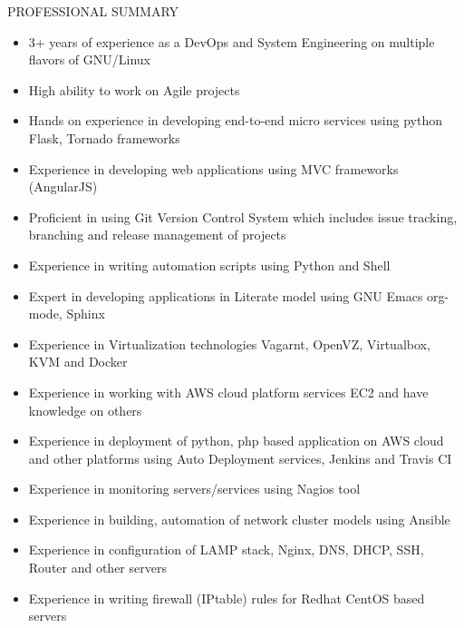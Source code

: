 \documentclass{resume} %
\begin{document}
\begin{rSection}{PROFESSIONAL SUMMARY}
  
  \begin{itemize}
    
  \item 3+ years of experience as a DevOps and System
    Engineering on multiple flavors of GNU/Linux

  \item High ability to work on Agile projects

  \item Hands on experience in developing end-to-end micro
    services using python Flask, Tornado frameworks
    
  \item Experience in developing web applications using MVC
    frameworks (AngularJS)
    
  \item Proficient in using Git Version Control System which
    includes issue tracking, branching and release
    management of projects

  \item Experience in writing automation scripts using
    Python and Shell

  \item Expert in developing applications in Literate model
    using GNU Emacs org-mode, Sphinx
    
  \item Experience in Virtualization technologies
    Vagarnt, OpenVZ, Virtualbox, KVM and Docker

  \item Experience in working with AWS cloud platform
    services EC2 and have knowledge on others

  \item Experience in deployment of python, php based
    application on AWS cloud and other platforms using Auto
    Deployment services, Jenkins and Travis CI

  \item Experience in monitoring servers/services using
    Nagios tool
    
  \item Experience in building, automation of network
    cluster models using Ansible
    
  \item Experience in configuration of LAMP stack,
    Nginx, DNS, DHCP, SSH, Router and other servers

  \item Experience in writing firewall (IPtable) rules for
    Redhat CentOS based servers
    

\end{itemize}
\end{rSection}
\end{document}
